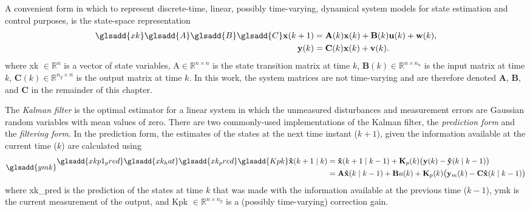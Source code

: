 A convenient form in which to represent discrete-time, linear, possibly time-varying, dynamical system models for state estimation and control purposes, is the state-space representation
\begin{equation} \label{eq:ss_rep_uwy}
	\begin{aligned} \glsadd{xk} \glsadd{A} \glsadd{B} \glsadd{C}
		\mathbf{x}(k+1) &= \mathbf{A}(k) \mathbf{x}(k) + \mathbf{B}(k) \mathbf{u}(k) + \mathbf{w}(k), \\
		\mathbf{y}(k) &= \mathbf{C}(k) \mathbf{x}(k) + \mathbf{v}(k).
	\end{aligned}
\end{equation}
where \gls{xk} $\in \mathbb{R}^n$ is a vector of state variables, \gls{A}$\in \mathbb{R}^{n \times n}$ is the state transition matrix at time $k$, $\mathbf{B}(k) \in \mathbb{R}^{n \times n_u}$ is the input matrix at time $k$, $\mathbf{C}(k) \in \mathbb{R}^{n_y \times n}$ is the output matrix at time $k$. In this work, the system matrices are not time-varying and are therefore denoted $\mathbf{A}$, $\mathbf{B}$, and $\mathbf{C}$ in the remainder of this chapter.

The \textit{Kalman filter} \citep{kalman_new_1960} is the optimal estimator for a linear system in which the unmeasured disturbances and measurement errors are Gaussian random variables with mean values of zero. There are two commonly-used implementations of the Kalman filter, the \textit{prediction form} and the \textit{filtering form}. In the prediction form, the estimates of the states at the next time instant ($k+1$), given the information available at the current time ($k$) are calculated using
\begin{equation} \glsadd{ymk}
\begin{aligned} \label{eq:xkp1_hat_p} \glsadd{xkp1_pred} \glsadd{xk_hat} \glsadd{xk_pred} \glsadd{Kpk}
	\mathbf{\hat{x}}(k+1 \mid k) &= \mathbf{\hat{x}}(k+1 \mid k-1) + \mathbf{K}_p(k) \big( \mathbf{y}(k) - \mathbf{\hat{y}}(k \mid k-1) \big) \\
	&= \mathbf{A}\mathbf{\hat{x}}(k \mid k-1) + \mathbf{B}u(k) + \mathbf{K}_p(k) \big( \mathbf{y}_m(k) - \mathbf{C} \mathbf{\hat{x}}(k \mid k-1) \big)
\end{aligned}
\end{equation}
where \gls{xk_pred} is the prediction of the states at time $k$ that was made with the information available at the previous time ($k-1$), \gls{ymk} is the current measurement of the output, and \gls{Kpk} $\in \mathbb{R}^{n \times n_y}$ is a (possibly time-varying) correction gain.

